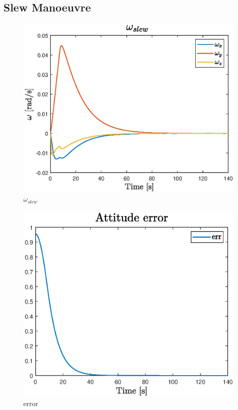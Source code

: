 \documentclass[11pt]{article}
\begin{document}
\subsection{Slew Manoeuvre}
\begin{minipage}{.48 \textwidth}
\begin{figure} [H]
\centering 
\includegraphics[scale=0.6]{w_slew.eps}
\caption{ $\omega_{slew}$}
\end{figure}
\end{minipage}
\begin{minipage}{.52 \textwidth}
\begin{figure} [H]
\centering 
\includegraphics[scale=0.6]{A_err_slew.eps}
\caption{ error}
\label{err}
\end{figure}
\end{minipage}\\\\
\end{document}
